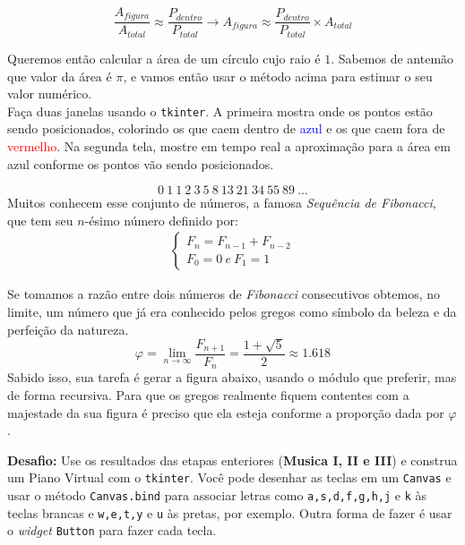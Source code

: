 \documentclass[12pt]{article}
\begin{document}
	$$ \frac{A_{figura}}{A_{total}} \approx \frac{P_{dentro}}{P_{total}} \to A_{figura} \approx \frac{P_{dentro}}{P_{total}} \times A_{total} $$

	Queremos então calcular a área de um círculo cujo raio é $1$. Sabemos de antemão que valor da área é $\pi$, e vamos então usar o método acima para estimar o seu valor numérico.\\

	Faça duas janelas usando o \texttt{tkinter}. A primeira mostra onde os pontos estão sendo posicionados, colorindo os que caem dentro de \textcolor{blue}{azul} e os que caem fora de \textcolor{red}{vermelho}. Na segunda tela, mostre em tempo real a aproximação para a área em azul conforme os pontos vão sendo posicionados. \\
	
	
	
	\[0\ 1\ 1\ 2\ 3\ 5\ 8\ 13\ 21\ 34\ 55\ 89\ ... \]	
	Muitos conhecem esse conjunto de números, a famosa \emph{Sequência de Fibonacci}, que tem seu $n$-ésimo número definido por:
	\begin{align*}
	\begin{cases}
	F_{n} = F_{n-1} + F_{n-2}\\
	F_{0} = 0 \ e \ F_{1} = 1
	\end{cases}
	\end{align*}
	
	Se tomamos a razão entre dois números de \emph{Fibonacci} consecutivos obtemos, no limite, um número que já era conhecido pelos gregos como símbolo da beleza e da perfeição da natureza.
	$$\varphi = \lim_{n \to \infty} \frac{F_{n+1}}{F_{n}}= \frac{1+\sqrt{5}}{2} \approx 1.618 $$
	Sabido isso, sua tarefa é gerar a figura abaixo, usando o módulo que preferir, mas de forma recursiva. Para que os gregos realmente fiquem contentes com a majestade da sua figura é preciso que ela esteja conforme a proporção dada por $\varphi$.
	
	
	
	\textbf{Desafio:} Use os resultados das etapas enteriores (\textbf{Musica I, II e III}) e construa um Piano Virtual com o \texttt{tkinter}. Você pode desenhar as teclas em um \texttt{Canvas} e usar o método \texttt{Canvas.bind} para associar letras como \texttt{a,s,d,f,g,h,j} e \texttt{k} às teclas brancas e \texttt{w,e,t,y} e \texttt{u} às pretas, por exemplo. Outra forma de fazer é usar o \textit{widget} \texttt{Button} para fazer cada tecla.
\end{document}
